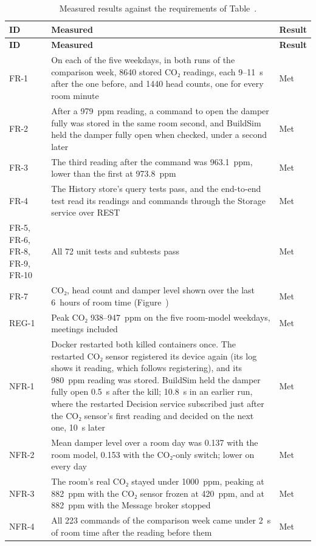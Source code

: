 \documentclass[11pt]{article}
\makeatletter
\newcommand{\reqfield}[2]{\csname req@#1@#2\endcsname}
\newcommand{\req}[1]{\pdftooltip{\hyperlink{req:#1}{#1}}%
  {#1: \reqfield{#1}{text}. Criterion: \reqfield{#1}{criterion}.}}
\def\ref#1{\getrefnumber{#1}}%
\def\req#1{#1}}
\makeatother
\begin{document}
\begin{longtable}[]{@{}
  >{\raggedright\arraybackslash}p{}
  >{\raggedright\arraybackslash}p{}
  >{\raggedright\arraybackslash}p{}@{}}
\caption{Measured results against the requirements of
Table~\ref{tab:requirements}.}\label{tab:results}\\
\toprule
\textbf{ID} & \textbf{Measured} & \textbf{Result} \\
\midrule
\endfirsthead
\toprule
\textbf{ID} & \textbf{Measured} & \textbf{Result} \\
\midrule
\endhead
\req{FR-1} & On each of the five weekdays, in both runs of the comparison week, 8640 stored CO₂ readings, each 9--11~s
after the one before, and 1440 head counts, one for every room minute & Met \\
\midrule
\req{FR-2} & After a 979~ppm reading, a command to open the damper fully was
stored in the same room second, and BuildSim held the damper fully open
when checked, under a second later & Met \\
\midrule
\req{FR-3} & The third reading after the command was 963.1~ppm, lower than the
first at 973.8~ppm & Met \\
\midrule
\req{FR-4} & The History store's query tests pass, and the end-to-end
test read its readings and commands through the Storage service over REST
& Met \\
\midrule
\req{FR-5}, \req{FR-6}, \req{FR-8}, \req{FR-9}, \req{FR-10} & All 72 unit tests and subtests
pass & Met \\
\midrule
\req{FR-7} & CO₂, head count and damper level shown over the last
6~hours of room time (Figure~\ref{fig:dashboard}) & Met \\
\midrule
\req{REG-1} & Peak CO₂ 938--947~ppm on the five room-model weekdays, meetings
included & Met \\
\midrule
\req{NFR-1} & Docker restarted both killed containers once. The restarted
CO₂ sensor registered its device again (its log shows it reading, which
follows registering), and its 980~ppm reading was stored. BuildSim held
the damper fully open 0.5~s after the kill; 10.8~s in an earlier run, where the restarted
Decision service subscribed just after the CO₂ sensor's first reading
and decided on the next one, 10~s later & Met \\
\midrule
\req{NFR-2} & Mean damper level over a room day was 0.137 with the room model,
0.153 with the CO₂-only switch; lower on every day & Met \\
\midrule
\req{NFR-3} & The room's real CO₂ stayed under 1000~ppm, peaking at
882~ppm with the CO₂ sensor frozen at 420~ppm, and at 882~ppm with the
Message broker stopped & Met \\
\midrule
\req{NFR-4} & All 223 commands of the comparison week came under 2~s
of room time after the reading before them & Met \\
\bottomrule
\end{longtable}
\end{document}

